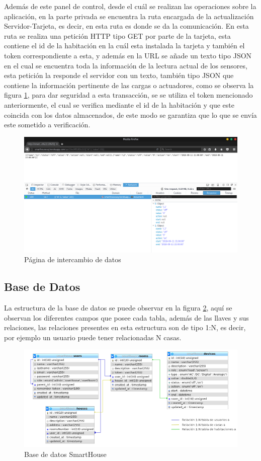 	

Además de este panel de control, desde el cuál se realizan las operaciones sobre la aplicación, en la parte privada se encuentra la ruta encargada de la actualización Servidor-Tarjeta, es decir, en esta ruta es donde se da la comunicación. En esta ruta se realiza una petición HTTP tipo GET por parte de la tarjeta, esta contiene el id de la habitación en la cuál esta instalada la tarjeta y también el token correspondiente a esta, y además en la URL se añade un texto tipo JSON en el cual se encuentra toda la información de la lectura actual de los sensores, esta petición la responde el servidor con un texto, también tipo JSON que contiene la información pertinente de las cargas o actuadores, como se observa la figura \ref{fig:updateview}, para dar seguridad a esta transacción, se se utiliza el token mencionado anteriormente, el cual se verifica mediante el id de la habitación y que este coincida con los datos almacenados, de este modo se garantiza que lo que se envía este sometido a verificación.

\begin{figure}[H]
\centering
\caption{Página de intercambio de datos}
\label{fig:updateview}
\includegraphics[width=0.9\linewidth]{Imagenes/Update_view}
\end{figure}


\subsection{Base de Datos}

La estructura de la base de datos se puede observar en la figura \ref{fig:db}, aquí se observan los diferentes campos que posee cada tabla, además de las llaves y sus relaciones, las relaciones presentes en esta estructura son de tipo 1:N, es decir, por ejemplo un usuario puede tener relacionadas N casas.

\begin{figure}[H]
\centering
\caption{Base de datos SmartHouse}
\label{fig:db}
\includegraphics[width=0.7\linewidth]{Imagenes/DB}
\end{figure}

